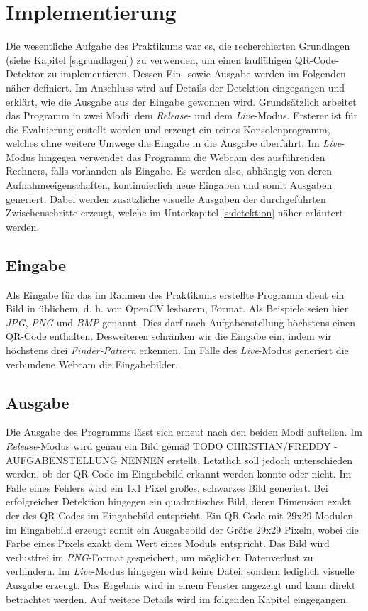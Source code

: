 \documentclass[a4paper, oneside, 12pt]{article}
\begin{document}
\newpage
\section{Implementierung}
\label{s:implementierung}
Die wesentliche Aufgabe des Praktikums war es, die recherchierten Grundlagen (siehe Kapitel \ref{s:grundlagen}) zu verwenden, um einen lauffähigen QR-Code-Detektor zu implementieren. Dessen Ein- sowie Ausgabe werden im Folgenden näher definiert.
Im Anschluss wird auf Details der Detektion eingegangen und erklärt, wie die Ausgabe aus der Eingabe gewonnen wird.
Grundsätzlich arbeitet das Programm in zwei Modi: dem \emph{Release}- und dem \emph{Live}-Modus.
Ersterer ist für die Evaluierung erstellt worden und erzeugt ein reines Konsolenprogramm, welches ohne weitere Umwege die Eingabe in die Ausgabe überführt.
Im \emph{Live}-Modus hingegen verwendet das Programm die Webcam des ausführenden Rechners, falls vorhanden als Eingabe. Es werden also, abhängig von deren Aufnahmeeigenschaften, kontinuierlich neue Eingaben und somit Ausgaben generiert. Dabei werden zusätzliche visuelle Ausgaben der durchgeführten Zwischenschritte erzeugt, welche im Unterkapitel \ref{s:detektion} näher erläutert werden.

\subsection{Eingabe}
\label{s:eingabe}

Als Eingabe für das im Rahmen des Praktikums erstellte Programm dient ein Bild in üblichem, d. h. von OpenCV lesbarem, Format. Als Beispiele seien hier \emph{JPG}, \emph{PNG} und \emph{BMP} genannt.
Dies darf nach Aufgabenstellung höchstens einen QR-Code enthalten.
Desweiteren schränken wir die Eingabe ein, indem wir höchstens drei \emph{Finder-Pattern} erkennen.
Im Falle des \emph{Live}-Modus generiert die verbundene Webcam die Eingabebilder.

\subsection{Ausgabe}
\label{s:ausgabe}

Die Ausgabe des Programms lässt sich erneut nach den beiden Modi aufteilen.
Im \emph{Release}-Modus wird genau ein Bild gemäß
TODO CHRISTIAN/FREDDY - AUFGABENSTELLUNG NENNEN
erstellt. Letztlich soll jedoch unterschieden werden, ob der QR-Code im Eingabebild erkannt werden konnte oder nicht. Im Falle eines Fehlers wird ein 1x1 Pixel großes, schwarzes Bild generiert. Bei erfolgreicher Detektion hingegen ein quadratisches Bild, deren Dimension exakt der des QR-Codes im Eingabebild entspricht.
Ein QR-Code mit 29x29 Modulen im Eingabebild erzeugt somit ein Ausgabebild der Größe 29x29 Pixeln, wobei die Farbe eines Pixels exakt dem Wert eines Moduls entspricht.
Das Bild wird verlustfrei im \emph{PNG}-Format gespeichert, um möglichen Datenverlust zu verhindern.
Im \emph{Live}-Modus hingegen wird keine Datei, sondern lediglich visuelle Ausgabe erzeugt. Das Ergebnis wird in einem Fenster angezeigt und kann direkt betrachtet werden. Auf weitere Details wird im folgenden Kapitel eingegangen.
\end{document}
